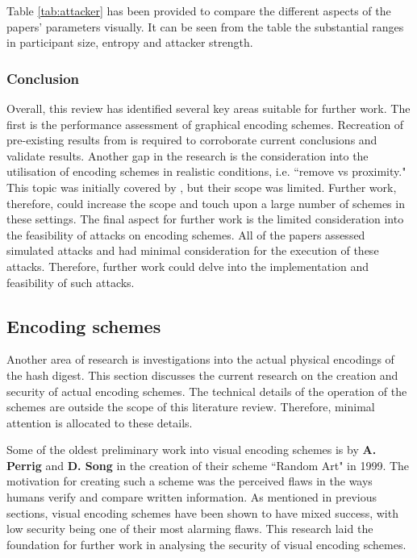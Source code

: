 Table \ref{tab:attacker} has been provided to compare the different aspects of the papers' parameters visually. It can be seen from the table the substantial ranges in participant size, entropy and attacker strength.

\subsubsection*{Conclusion}
Overall, this review has identified several key areas suitable for further work.
The first is the performance assessment of graphical encoding schemes. Recreation of pre-existing results from \cite{hsiao2009study}\cite{tan2017can} is required to corroborate current conclusions and validate results.
Another gap in the research is the consideration into the utilisation of encoding schemes in realistic conditions, i.e. ``remove vs proximity." This topic was initially covered by \cite{shirvanian2017pitfalls}, but their scope was limited. Further work, therefore, could increase the scope and touch upon a large number of schemes in these settings. The final aspect for further work is the limited consideration into the feasibility of attacks on encoding schemes. All of the papers assessed simulated attacks and had minimal consideration for the execution of these attacks. Therefore, further work could delve
into the implementation and feasibility of such attacks.

\subsection{Encoding schemes}
Another area of research is investigations into the actual physical encodings of the hash digest. This section discusses the current research on the creation and security of actual encoding schemes. The technical details of the operation of the schemes are outside the scope of this literature review. Therefore, minimal attention is allocated to these details.

Some of the oldest preliminary work into visual encoding schemes is by \textbf{A. Perrig} and \textbf{D. Song}\cite{perrig1999hash} in the creation of their scheme ``Random Art" in 1999. The motivation for creating such a scheme was the perceived flaws in the ways humans verify and compare written information. As mentioned in previous sections, visual encoding schemes have been shown to have mixed success, with low security being one of their most alarming flaws. This research laid the foundation for further work in analysing the security of visual encoding schemes.

